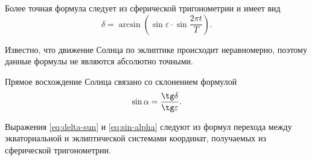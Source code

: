 Более точная формула следует из сферической тригонометрии и имеет вид
\begin{equation}
\delta=\arcsin\left(\sin\varepsilon\cdot\sin \frac{2 \pi t}{T}\right).
\label{eq:delta-sun}
\end{equation}

Известно, что движение Солнца по эклиптике происходит неравномерно, поэтому данные формулы не являются абсолютно точными.

Прямое восхождение Солнца связано со склонением формулой
\begin{equation}
\sin\alpha=\frac{\tg\delta}{\tg\varepsilon}.
\label{eq:sin-alpha}
\end{equation}

Выражения \eqref{eq:delta-sun} и \eqref{eq:sin-alpha} следуют из формул перехода между экваториальной и эклиптической системами координат, получаемых из сферической тригонометрии.
